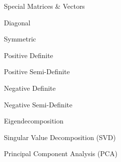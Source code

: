 \documentclass[11pt]{article}
\begin{document}
\begin{enumerate}
\begin{item}
\begin{enumerate}
\begin{item}
\begin{enumerate}
            \end{enumerate}

          \end{item}

          \begin{item}

            Special Matrices \& Vectors

            \begin{enumerate}

                \begin{item}
                  Diagonal
                \end{item}

                \begin{item}
                  Symmetric
                \end{item}

                \begin{item}
                  Positive Definite 
                \end{item}

                \begin{item}
                  Positive Semi-Definite 
                \end{item}

                \begin{item}
                  Negative Definite 
                \end{item}

                \begin{item}
                  Negative Semi-Definite 
                \end{item}

            \end{enumerate}

          \end{item}

          \begin{item}

            Eigendecomposition

          \end{item}

          \begin{item}
            Singular Value Decomposition (SVD)
          \end{item}

          \begin{item}
            Principal Component Analysis (PCA)
          \end{item}


\end{enumerate}
\end{item}
\end{enumerate}
\end{document}
